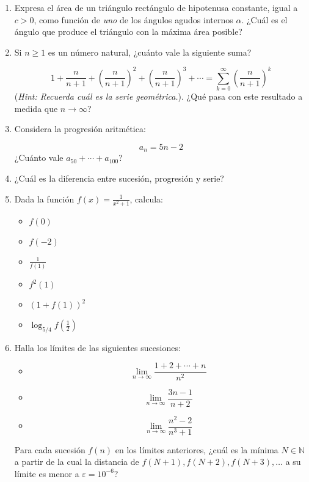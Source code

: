 \documentclass[10pt,a4paper]{article}
\begin{document}
\begin{enumerate}
		\item Expresa el área de un triángulo rectángulo de hipotenusa constante, igual a $c>0$, como función de \textit{uno} de los ángulos agudos internos $\alpha$. ¿Cuál es el ángulo que produce el triángulo con la máxima área posible?
		
		\item Si $n\geq 1$ es un número natural, ¿cuánto vale la siguiente suma?
		
			\[ 1+\frac{n}{n+1}+\left(\frac{n}{n+1}\right)^2+\left(\frac{n}{n+1}\right)^3+\cdots
				= \sum_{k=0}^{\infty} \left(\frac{n}{n+1}\right)^k \]
(\textit{Hint: Recuerda cuál es la serie geométrica.}). ¿Qué pasa con este resultado a medida que $n\longrightarrow\infty$?

		\item Considera la progresión aritmética:
		
			\[a_n=5n-2\]
¿Cuánto vale $a_{50}+\cdots+a_{100}$?

		\item ¿Cuál es la diferencia entre sucesión, progresión y serie?
		
		\item Dada la función $f(x)=\frac{1}{x^2+1}$, calcula:
		
			\begin{multicols}{3}
				\begin{itemize}
					\item $f(0)$
					\item $f(-2)$
					\item $\frac{1}{f(1)}$
					\item $f^2(1)$
					\item $\left(1+f(1)\right)^2$
					\item $\log_{5/4} f\left(\frac{1}{2}\right)$
				\end{itemize}
			\end{multicols}
		
		\item Halla los límites de las siguientes sucesiones:
		
			\begin{multicols}{3}
				\begin{itemize}
					\item[] $$\lim_{n\to\infty}\frac{1+2+\cdots +n}{n^2}$$
					\item[] $$\lim_{n\to\infty}\frac{3n-1}{n+2}$$
					\item[] $$\lim_{n\to\infty}\frac{n^2-2}{n^3+1}$$
				\end{itemize}
			\end{multicols}
Para cada sucesión $f(n)$ en los límites anteriores, ¿cuál es la mínima $N\in\mathbb{N}$ a partir de la cual la distancia de $f(N+1), f(N+2), f(N+3), \dots$ a su límite es menor a $\varepsilon=10^{-6}$?


\end{enumerate}
\end{document}
